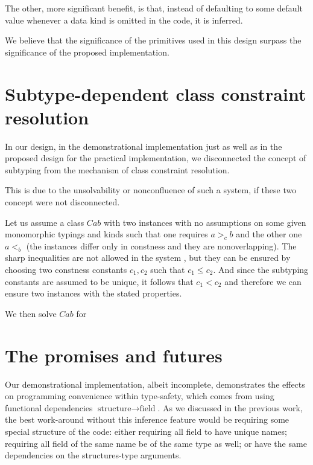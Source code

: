 The other, more significant benefit, is that, instead of defaulting to some default value whenever a data kind is omitted in the \cmm code, it is inferred.

We believe that the significance of the primitives used in this design surpass the significance of the proposed implementation. 

\section{Subtype-dependent class constraint resolution}

In our design, in the demonstrational implementation just as well as in the proposed design for the practical implementation, we disconnected the concept of subtyping from the mechanism of class constraint resolution.

This is due to the unsolvability or nonconfluence of such a system, if these two concept were not disconnected.

\begin{ex}
    Let us assume a class $C a b$ with two instances with no assumptions on some given monomorphic typings and kinds such that one requires $a >_c b$ and the other one $a <_ b$ (the instances differ only in constness and they are nonoverlapping). The sharp inequalities are not allowed in the system , but they can be ensured by choosing two constness constants $c_1, c_2$ such that $c_1 \leq c_2$. And since the subtyping constants are assumed to be unique, it follows that $c_1 < c_2$ and therefore we can ensure two instances with the stated properties.

    We then solve $C a b$ for
\end{ex}

\section{The promises and futures}
Our demonstrational implementation, albeit incomplete, demonstrates the effects on programming convenience within type-safety, which comes from using functional dependencies $\text{structure} \to \text{field}$. As we discussed in the previous work, the best work-around without this inference feature would be requiring some special structure of the code: either requiring all field to have unique names; requiring all field of the same name be of the same type as well; or have the same dependencies on the structures-type arguments.



